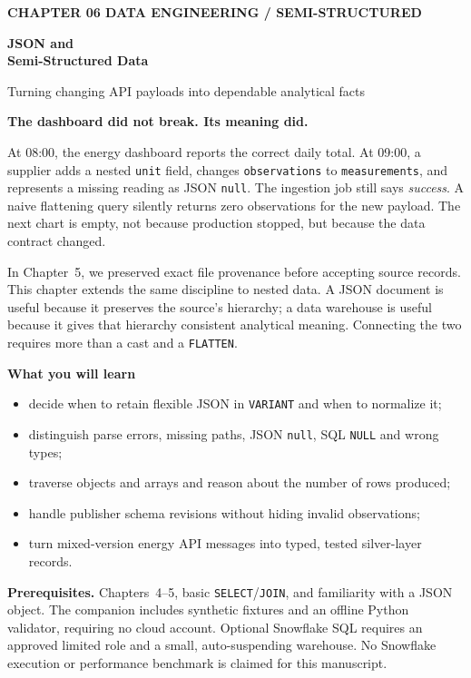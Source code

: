 \documentclass[11pt,twoside]{article}
\begin{document}
{\sffamily\bfseries\fontsize{9}{11}\selectfont\color{steelblue} CHAPTER 06 \hfill DATA ENGINEERING / SEMI-STRUCTURED}\par\vspace{3mm}
{\sffamily\bfseries\fontsize{22}{26}\selectfont\color{navy} JSON and\\Semi-Structured Data}\par\vspace{2mm}
{\sffamily\fontsize{11.3}{14}\selectfont\color{steelblue} Turning changing API payloads into dependable analytical facts}\par\vspace{5mm}
\begin{insight}\textbf{The dashboard did not break. Its meaning did.}\par
At 08:00, the energy dashboard reports the correct daily total. At 09:00, a supplier adds a nested \texttt{unit} field, changes \texttt{observations} to \texttt{measurements}, and represents a missing reading as JSON \texttt{null}. The ingestion job still says \emph{success}. A naive flattening query silently returns zero observations for the new payload. The next chart is empty, not because production stopped, but because the data contract changed.\end{insight}
In Chapter~5, we preserved exact file provenance before accepting source records. This chapter extends the same discipline to nested data. A JSON document is useful because it preserves the source's hierarchy; a data warehouse is useful because it gives that hierarchy consistent analytical meaning. Connecting the two requires more than a cast and a \texttt{FLATTEN}.

\begin{whitebox}\textbf{What you will learn}
\begin{itemize}
\item decide when to retain flexible JSON in \texttt{VARIANT} and when to normalize it;
\item distinguish parse errors, missing paths, JSON \texttt{null}, SQL \texttt{NULL} and wrong types;
\item traverse objects and arrays and reason about the number of rows produced;
\item handle publisher schema revisions without hiding invalid observations;
\item turn mixed-version energy API messages into typed, tested silver-layer records.
\end{itemize}\end{whitebox}
\textbf{Prerequisites.} Chapters~4--5, basic \texttt{SELECT}/\texttt{JOIN}, and familiarity with a JSON object. The companion includes synthetic fixtures and an offline Python validator, requiring no cloud account. Optional Snowflake SQL requires an approved limited role and a small, auto-suspending warehouse. No Snowflake execution or performance benchmark is claimed for this manuscript.
\end{document}
